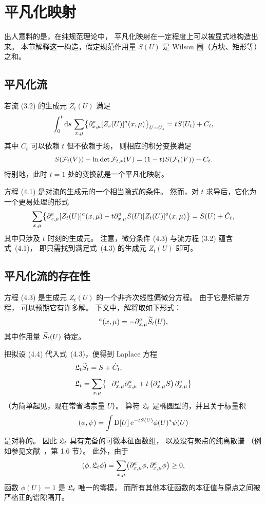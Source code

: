 \section{平凡化映射}

出人意料的是，在纯规范理论中，
平凡化映射在一定程度上可以被显式地构造出来。
本节解释这一构造，假定规范作用量 $S(U)$
是 Wilson 圈（方块、矩形等）之和。


\subsection{平凡化流}

若流 (3.2) 的生成元 $Z_t(U)$ 满足
\begin{equation}
  \int_0^t\mathrm{d} s\,\sum_{x,\mu}
  \bigl\{\partial^a_{x,\mu}[Z_s(U)]^a(x,\mu)\bigr\}_{U=U_s}
  =tS(U_t)+C_t,
\end{equation}
其中 $C_t$ 可以依赖 $t$ 但不依赖于场，
则相应的积分变换满足
\begin{equation}
  S(\mathcal{F}_{t}(V))-\ln\det\mathcal{F}_{t,*}(V)=(1-t)S(\mathcal{F}_{t}(V))-C_t.
\end{equation}
特别地，此时 $t=1$ 处的变换就是一个平凡化映射。

方程 (4.1) 是对流的生成元的一个相当隐式的条件。
然而，对 $t$ 求导后，它化为一个更易处理的形式
\begin{equation}
  \sum_{x,\mu}\bigl\{
  \partial^a_{x,\mu}[Z_t(U)]^a(x,\mu)
  -t\partial^a_{x,\mu}S(U)[Z_t(U)]^a(x,\mu)\bigr\}=
  S(U)+\dot{C}_t,
\end{equation}
其中只涉及 $t$ 时刻的生成元。
注意，微分条件 (4.3)
与流方程 (3.2) 蕴含式~(4.1)，
即只需找到满足式~(4.3) 的生成元 $Z_t(U)$ 即可。


\subsection{平凡化流的存在性}

方程 (4.3) 是生成元 $Z_t(U)$ 的一个非齐次线性偏微分方程。
由于它是标量方程，
可以预期它有许多解。
下文中，解将取如下形式：
\begin{equation}
  [Z_t(U)]^a(x,\mu)=-\du^a_{x,\mu}\Sflow_t(U),
\end{equation}
其中作用量 $\widetilde{S}_t(U)$ 待定。

把拟设 (4.4) 代入式~(4.3)，便得到 Laplace 方程
\begin{align}
  &\mathfrak{L}_t\widetilde{S}_t=S+\dot{C}_t,
  \\[1.0ex]
  &\mathfrak{L}_t=
  \sum_{x,\mu}\bigl\{
  -\partial^a_{x,\mu}\partial^a_{x,\mu}
  +t\left(\partial^a_{x,\mu}S\right)\partial^a_{x,\mu}\bigr\}
\end{align}
（为简单起见，现在常省略宗量 $U$）。
算符 $\mathfrak{L}_t$ 是椭圆型的，并且关于标量积
\begin{equation}
   (\phi,\psi)=\int\mathrm{D}[U]\,\mathrm{e}^{-tS(U)}\phi(U)^*\psi(U)
\end{equation}
是对称的。
因此 $\mathfrak{L}_t$ 具有完备的可微本征函数组，
以及没有聚点的纯离散谱
（例如参见文献~\cite{Gilkey}，第 1.6 节）。
此外，由于
\begin{equation}
   (\phi,\mathfrak{L}_t\phi)=\sum_{x,\mu}\bigl(\partial^a_{x,\mu}\phi,\partial^a_{x,\mu}\phi
   \bigr)\geq0,
\end{equation}
函数 $\phi(U)=1$ 是 $\mathfrak{L}_t$ 唯一的零模，
而所有其他本征函数的本征值与原点之间被严格正的谱隙隔开。

